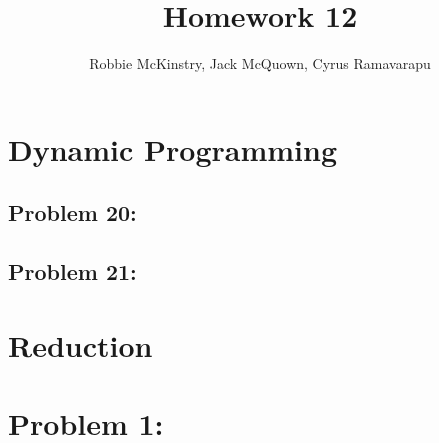 \documentclass[12pt]{article}
\begin{document}
\title{Homework 12}
\author{Robbie McKinstry, Jack McQuown, Cyrus Ramavarapu}
\renewcommand{\today}{30 September 2016}
\renewcommand{\baselinestretch}{1.5}
\maketitle

\section*{Dynamic Programming}
\subsection*{Problem 20: }
\subsection*{Problem 21: }

\section*{Reduction}
\section*{Problem 1: }
\end{document}
